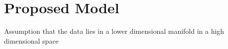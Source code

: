 \chapter{Proposed Model}

Assumption that the data lies in a lower dimensional manifold in a high dimensional space

